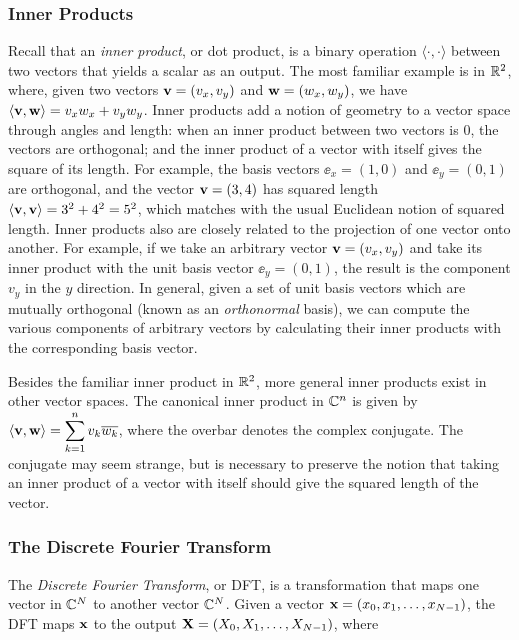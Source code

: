 \subsubsection{Inner Products} \label{sec:innerprod}
Recall that an {\em inner product}, or dot product, is a binary operation $\langle \cdot, \cdot \rangle$ between two vectors that yields a scalar as an output. The most familiar example is in $\mathbb{R}^2$, where, given two vectors $\mathbf{v} = (v_x, v_y)$ and $\mathbf{w} = (w_x, w_y)$, we have $\langle \mathbf{v}, \mathbf{w} \rangle = v_x w_x + v_y w_y$. Inner products add a notion of geometry to a vector space through angles and length: when an inner product between two vectors is $0$, the vectors are orthogonal; and the inner product of a vector with itself gives the square of its length. For example, the basis vectors $\ee_x = (1, 0)$ and $\ee_y = (0, 1)$ are orthogonal, and the vector $\mathbf{v} = (3, 4)$ has squared length $\langle \mathbf{v}, \mathbf{v} \rangle = 3^2 + 4^2 = 5^2$, which matches with the usual Euclidean notion of squared length. Inner products also are closely related to the projection of one vector onto another. For example, if we take an arbitrary vector $\mathbf{v} = (v_x, v_y)$ and take its inner product with the unit basis vector $\ee_y = (0, 1)$, the result is the component $v_y$ in the $y$ direction. In general, given a set of unit basis vectors which are mutually orthogonal (known as an {\em orthonormal} basis), we can compute the various components of arbitrary vectors by calculating their inner products with the corresponding basis vector.

Besides the familiar inner product in $\mathbb{R}^2$, more general inner products exist in other vector spaces. The canonical inner product in $\mathbb{C}^n$ is given by $\langle \mathbf{v}, \mathbf{w} \rangle = \displaystyle \sum_{k=1}^{n}v_k\overline{w_k}$, where the overbar denotes the complex conjugate. The conjugate may seem strange, but is necessary to preserve the notion that taking an inner product of a vector with itself should give the squared length of the vector. 

\subsubsection{The Discrete Fourier Transform} \label{sec: DFT}
The {\em Discrete Fourier Transform}, or DFT, is a transformation that maps one vector in $\mathbb{C}^{N}$ to another vector $\mathbb{C}^{N}$. Given a vector $\mathbf{x} = \left(x_0, x_1, \dots, x_{N-1}\right)$, the DFT maps $\mathbf{x}$ to the output $\mathbf{X} = \left(X_0, X_1, \dots, X_{N-1}\right)$, where

